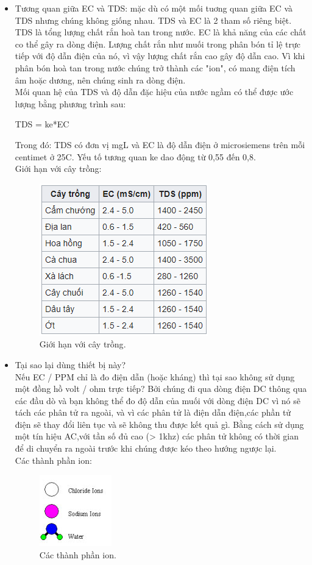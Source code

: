 \documentclass[a4paper,12pt,oneside]{article}
\begin{document}
\begin{itemize}
\item Tương quan giữa EC và TDS: mặc dù có một mối tuơng quan giữa EC và TDS nhưng chúng không giống nhau. TDS và EC là 2 tham số riêng biệt. TDS là tổng lượng chất rắn hoà tan trong nước. EC là khả năng của các chất co thể gây ra dòng điện. Lượng chất rắn như muối trong phân bón tỉ lệ trực tiếp với độ dẫn điện của nó, vì vậy lượng chất rắn cao gây độ dẫn cao. Vì khi phân bón hoà tan trong nước chúng trở thành các "ion", có mang điện tích âm hoặc dương, nên chúng sinh ra dòng điện.\\
Mối quan hệ của TDS và độ dẫn đặc hiệu của nước ngầm có thể được ước lượng bằng phương trình sau:
\begin{center}
		TDS = ke*EC
\end{center}					
Trong đó: TDS có đơn vị mg\/L và EC là độ dẫn điện ở microsiemens trên mỗi centimet ở 25\textdegree{}C. Yếu tố tương quan ke dao động từ 0,55 đến 0,8.\\
Giới hạn với cây trồng:
\begin{figure}[H]
	\centering
	\includegraphics[scale=.8]{hinh/PPM/ppm_thamkhao.PNG}
	\caption{Giới hạn với cây trồng\cite{ec}.}
	\label{fig:ppm_thamkhao}
\end{figure}

\item Tại sao lại dùng thiết bị này?\\
Nếu EC / PPM chỉ là đo điện dẫn (hoặc kháng) thì tại sao không sử dụng một đồng hồ volt / ohm trực tiếp? Bởi chúng đi qua dòng điện DC thông qua các đầu dò và bạn không thể đo độ dẫn của muối với dòng điện DC vì nó sẽ tách các phân tử ra ngoài, và vì các phân tử là điện dẫn điện,các phần tử điện sẽ thay đổi liên tục và sẽ không thu được kết quả gì. Bằng cách sử dụng một tín hiệu AC,với tần số đủ cao (> 1khz) các phân tử không có thời gian để di chuyển ra ngoài trước khi chúng được kéo theo hướng ngược lại.\\
Các thành phần ion:
\begin{figure}[H]
	\centering
	\includegraphics[scale=1]{hinh/PPM/ppm_ion.png}
	\caption{Các thành phần ion\cite{ppm}.}
	\label{fig:/ppm_ion}
\end{figure}


\end{itemize}
\end{document}
